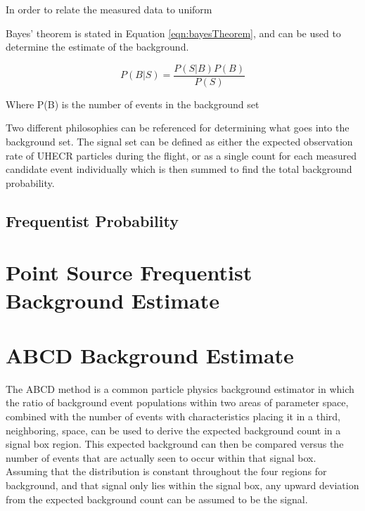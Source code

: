 	In order to relate the measured data to uniform 
	
	Bayes' theorem is stated in Equation \ref{eqn:bayesTheorem}, and can be used to determine the estimate of the background.

	\begin{equation}
		P(B | S) = \frac{P(S | B) P(B)}{P(S)}
	\label{eqn:bayesTheorem}
	\end{equation}
	
	Where P(B) is the number of events in the background set
	
	
	Two different philosophies can be referenced for determining what goes into the background set.  The signal set can be defined as either the expected observation rate of UHECR particles during the flight, or as a single count for each measured candidate event individually which is then summed to find the total background probability.
	
	\subsection{Frequentist Probability}
		
		
\section{Point Source Frequentist Background Estimate}
	
\section{ABCD Background Estimate}
		The ABCD method is a common particle physics background estimator in which the ratio of background event populations within two areas of parameter space, combined with the number of events with characteristics placing it in a third, neighboring, space, can be used to derive the expected background count in a signal box region.  This expected background can then be compared versus the number of events that are actually seen to occur within that signal box.  Assuming that the distribution is constant throughout the four regions for background, and that signal only lies within the signal box, any upward deviation from the expected background count can be assumed to be the signal.
		
